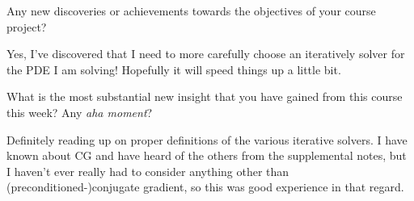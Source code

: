 \vspace*{3mm}

Any new discoveries or achievements towards the objectives of your course project?

\vspace*{3mm}
Yes, I've discovered that I need to more carefully choose an iteratively solver for the PDE I am solving! Hopefully it will speed things up a little bit.

\vspace*{3mm}

What is the most substantial new insight that you have gained from this course this week? Any \emph{aha moment}?

\vspace*{3mm}
Definitely reading up on proper definitions of the various iterative solvers.
I have known about \textsc{CG} and have heard of the others from the supplemental notes, but I haven't ever really had to consider anything other than (preconditioned-)conjugate gradient, so this was good experience in that regard.

\vspace*{3mm}

\newpage
\begin{appendices}
\newpage
\lhead{}
\section{}\label{hw11Code}
\textbf{\Large{}}
\end{appendices}



